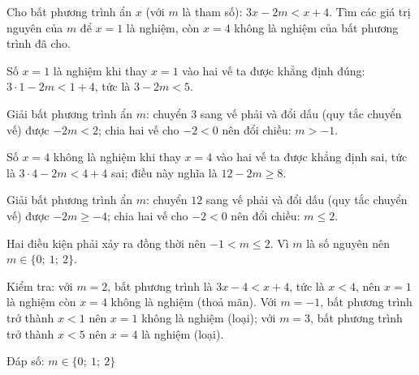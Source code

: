 \begin{problem}[9DS-BPT-027]
Cho bất phương trình ẩn $x$ (với $m$ là tham số): $3x - 2m < x + 4$. Tìm các giá trị nguyên của $m$ để $x = 1$ là nghiệm, còn $x = 4$ không là nghiệm của bất phương trình đã cho.

\begin{solution}
Số $x = 1$ là nghiệm khi thay $x = 1$ vào hai vế ta được khẳng định đúng: $3 \cdot 1 - 2m < 1 + 4$, tức là $3 - 2m < 5$.

Giải bất phương trình ẩn $m$: chuyển $3$ sang vế phải và đổi dấu (quy tắc chuyển vế) được $-2m < 2$; chia hai vế cho $-2 < 0$ nên đổi chiều: $m > -1$.

Số $x = 4$ không là nghiệm khi thay $x = 4$ vào hai vế ta được khẳng định sai, tức là $3 \cdot 4 - 2m < 4 + 4$ sai; điều này nghĩa là $12 - 2m \geq 8$.

Giải bất phương trình ẩn $m$: chuyển $12$ sang vế phải và đổi dấu (quy tắc chuyển vế) được $-2m \geq -4$; chia hai vế cho $-2 < 0$ nên đổi chiều: $m \leq 2$.

Hai điều kiện phải xảy ra đồng thời nên $-1 < m \leq 2$. Vì $m$ là số nguyên nên $m \in \{0;\ 1;\ 2\}$.

Kiểm tra: với $m = 2$, bất phương trình là $3x - 4 < x + 4$, tức là $x < 4$, nên $x = 1$ là nghiệm còn $x = 4$ không là nghiệm (thoả mãn). Với $m = -1$, bất phương trình trở thành $x < 1$ nên $x = 1$ không là nghiệm (loại); với $m = 3$, bất phương trình trở thành $x < 5$ nên $x = 4$ là nghiệm (loại).

Đáp số: $\boxed{m \in \{0;\ 1;\ 2\}}$
\end{solution}
\end{problem}

